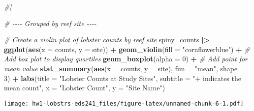 \documentclass[
]{article}
\newenvironment{Shaded}{\begin{snugshade}}{\end{snugshade}}
\newcommand{\AttributeTok}[1]{\textcolor[rgb]{0.13,0.29,0.53}{#1}}
\newcommand{\CommentTok}[1]{\textcolor[rgb]{0.56,0.35,0.01}{\textit{#1}}}
\newcommand{\DecValTok}[1]{\textcolor[rgb]{0.00,0.00,0.81}{#1}}
\newcommand{\FunctionTok}[1]{\textcolor[rgb]{0.13,0.29,0.53}{\textbf{#1}}}
\newcommand{\NormalTok}[1]{#1}
\newcommand{\SpecialCharTok}[1]{\textcolor[rgb]{0.81,0.36,0.00}{\textbf{#1}}}
\newcommand{\StringTok}[1]{\textcolor[rgb]{0.31,0.60,0.02}{#1}}
\begin{document}
\begin{Shaded}
\begin{Highlighting}[]
\CommentTok{\#|}

\CommentTok{\# {-}{-}{-}{-} Grouped by reef site {-}{-}{-}{-}}

\CommentTok{\# Create a violin plot of lobster counts by reef site}
\NormalTok{spiny\_counts }\SpecialCharTok{|\textgreater{}} 
\FunctionTok{ggplot}\NormalTok{(}\FunctionTok{aes}\NormalTok{(}\AttributeTok{x =}\NormalTok{ counts, }\AttributeTok{y =}\NormalTok{ site)) }\SpecialCharTok{+}
  \FunctionTok{geom\_violin}\NormalTok{(}\AttributeTok{fill =} \StringTok{"cornflowerblue"}\NormalTok{) }\SpecialCharTok{+}
    \CommentTok{\# Add box plot to display quartiles}
    \FunctionTok{geom\_boxplot}\NormalTok{(}\AttributeTok{alpha =} \DecValTok{0}\NormalTok{) }\SpecialCharTok{+}
    \CommentTok{\# Add point for mean value}
    \FunctionTok{stat\_summary}\NormalTok{(}\FunctionTok{aes}\NormalTok{(}\AttributeTok{x =}\NormalTok{ counts, }\AttributeTok{y =}\NormalTok{ site),}
                 \AttributeTok{fun =} \StringTok{"mean"}\NormalTok{,}
                 \AttributeTok{shape =} \DecValTok{3}\NormalTok{) }\SpecialCharTok{+} 
    \FunctionTok{labs}\NormalTok{(}\AttributeTok{title =} \StringTok{"Lobster Counts at Study Sites"}\NormalTok{,}
         \AttributeTok{subtitle =} \StringTok{"+ indicates the mean count"}\NormalTok{,}
         \AttributeTok{x =} \StringTok{"Lobster Count"}\NormalTok{,}
         \AttributeTok{y =} \StringTok{"Site Name"}\NormalTok{)}
\end{Highlighting}
\end{Shaded}

\texttt{[image: hw1-lobstrs-eds241\_files/figure-latex/unnamed-chunk-6-1.pdf]}
\end{document}
